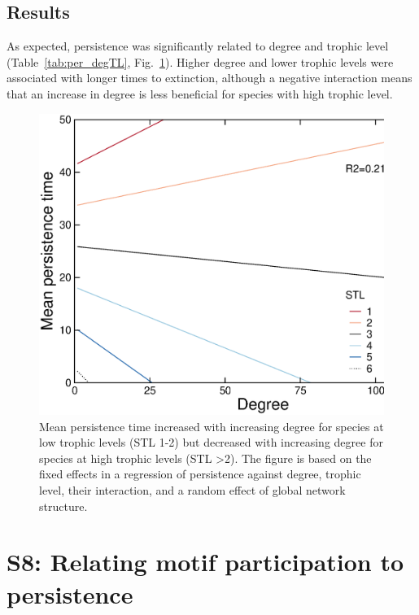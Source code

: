 \documentclass[12pt]{article}
\begin{document}
\begin{spacing}{2.0}
	\subsection*{Results}

		As expected, persistence was significantly related to degree and trophic level (Table~\ref{tab:per_degTL}, Fig.~\ref{fig:persistence_degTL}).
		Higher degree and lower trophic levels were associated with longer times to extinction, although a negative interaction means that an increase in degree is less beneficial for species with high trophic level.


	    \begin{figure}[hb!]
	        \centering
	        \includegraphics[width=.75\textwidth]{figures/roles/persistence_vs_degTL.eps}
	        \caption{Mean persistence time increased with increasing degree for species at low trophic levels (STL 1-2) but decreased with increasing degree for species at high trophic levels (STL \textgreater2). The figure is based on the fixed effects in a regression of persistence against degree, trophic level, their interaction, and a random effect of global network structure.}
	        \label{fig:persistence_degTL}
	    \end{figure}


\clearpage


\section*{S8: Relating motif participation to persistence}



\end{spacing}
\end{document}
